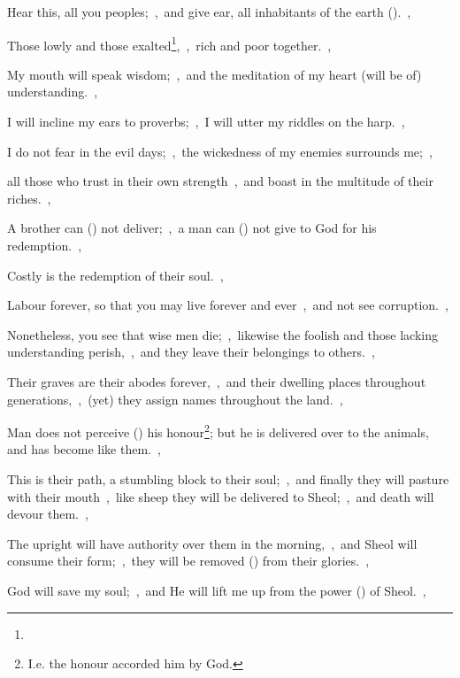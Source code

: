 \documentclass[12pt,twoside,a5paper]{article}
\begin{document}
\begin{normalparskip}
  Hear this, all you peoples;~\sep\ and give ear, all inhabitants of the earth ().~\sep


  Those lowly and those exalted\footnote{},~\sep\ rich and poor together.~\sep

  My mouth will speak wisdom;~\sep\ and the meditation of my heart (will be of) understanding.~\sep

  I will incline my ears to proverbs;~\sep\ I will utter my riddles on the harp.~\sep

  I do not fear in the evil days;~\sep\ the wickedness of my enemies surrounds me;~\sep

  all those who trust in their own strength~\sep\ and boast in the multitude of their riches.~\sep

  A brother can () not deliver;~\sep\ a man can () not give to God for his redemption.~\sep

  Costly is the redemption of their soul.~\sep

  Labour forever, so that you may live forever and ever~\sep\ and not see corruption.~\sep

  Nonetheless, you see that wise men die;~\sep\ likewise the foolish and those lacking understanding perish,~\sep\ and they leave their belongings to others.~\sep

  Their graves are their abodes forever,~\sep\ and their dwelling places throughout generations,~\sep\ (yet) they assign names throughout the land.~\sep

  Man does not perceive () his honour\footnote{I.e. the honour accorded him by God.}; but he is delivered over to the animals, and has become like them.~\sep

  This is their path, a stumbling block to their soul;~\sep\ and finally they will pasture with their mouth~\sep\ like sheep they will be delivered to Sheol;~\sep\ and death will devour them.~\sep

  The upright will have authority over them in the morning,~\sep\ and Sheol will consume their form;~\sep\ they will be removed () from their glories.~\sep

  God will save my soul;~\sep\ and He will lift me up from the power () of Sheol.~\sep


\end{normalparskip}
\end{document}

